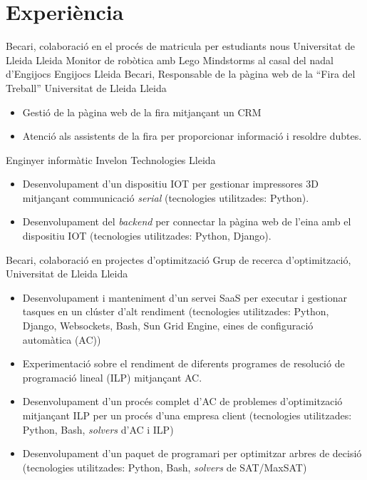 \documentclass{cv}
\begin{document}
\section{Experiència}
	{Becari, colaboració en el procés de matricula per estudiants nous}
	{Universitat de Lleida}
	{Lleida}
	{}
	{}
	{Monitor de robòtica amb Lego Mindstorms al casal del nadal d'Engijocs}
	{Engijocs}
	{Lleida}
	{}
	{}
	{Becari, Responsable de la pàgina web de la ``Fira del Treball''}
	{Universitat de Lleida}
	{Lleida}
	{}
	{\begin{itemize}
		\item Gestió de la pàgina web de la fira mitjançant un CRM
		\item Atenció als assistents de la fira per proporcionar informació i resoldre dubtes.
	\end{itemize}}
	{Enginyer informàtic}
	{Invelon Technologies}
	{Lleida}
	{}
	{\begin{itemize}
		\item Desenvolupament d'un dispositiu IOT per gestionar impressores 3D
			mitjançant communicació \textit{serial} (tecnologies utilitzades: Python).
		\item Desenvolupament del \textit{backend} per connectar la pàgina web
			de l'eina amb el dispositiu IOT (tecnologies utilitzades: Python, Django).
	\end{itemize}}
	{Becari, colaboració en projectes d'optimització}
	{Grup de recerca d'optimització, Universitat de Lleida}
	{Lleida}
	{}
	{\begin{itemize}
		\item Desenvolupament i manteniment d'un servei SaaS per executar i
			gestionar tasques en un clúster d'alt rendiment (tecnologies
			utilitzades: Python, Django, Websockets, Bash, Sun Grid Engine,
			eines de configuració automàtica (AC))
		\item Experimentació sobre el rendiment de diferents programes de
			resolució de programació lineal (ILP) mitjançant AC.
		\item Desenvolupament d'un procés complet d'AC de problemes
			d'optimització mitjançant ILP per un procés d'una empresa client
			(tecnologies utilitzades: Python, Bash, \textit{solvers} d'AC i 
			ILP)
		\item Desenvolupament d'un paquet de programari per optimitzar
			arbres de decisió (tecnologies utilitzades: Python, Bash,
			\textit{solvers} de SAT/MaxSAT)
	\end{itemize}}
\end{document}
